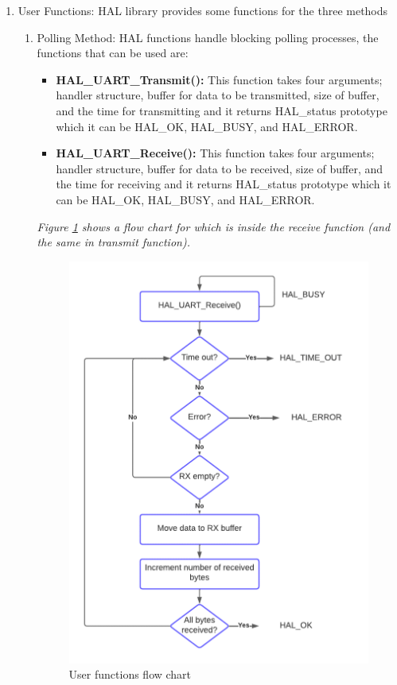 \begin{enumerate}
\begin{enumerate}
    \clearpage
    \end{enumerate}
    \item User Functions:
    HAL library provides some functions for the three methods
    \begin{enumerate}
        \item Polling Method:
        HAL functions handle blocking polling processes, the functions that can be used are:
        \begin{itemize}
            \item \textbf{HAL\_UART\_Transmit():} This function takes four arguments; handler structure, buffer for data to be transmitted, size of buffer, and the time for transmitting and it returns HAL\_status prototype which it can be HAL\_OK, HAL\_BUSY, and HAL\_ERROR.
            \item \textbf{HAL\_UART\_Receive():} This function takes four arguments; handler structure, buffer for data to be received, size of buffer, and the time for receiving and it returns HAL\_status prototype which it can be HAL\_OK, HAL\_BUSY, and HAL\_ERROR.\\
            
            
        \end{itemize}
        \emph{Figure \ref{fig:user-func-flow-chart} shows a flow chart for which is inside the receive function (and the same in transmit function).}
            \begin{figure}[h]
            \centering
            \includegraphics[width=.65\textwidth]{figure/4_5.png}
            \caption{User functions flow chart}
            \label{fig:user-func-flow-chart}
            \end{figure}


\end{enumerate}
\end{enumerate}
